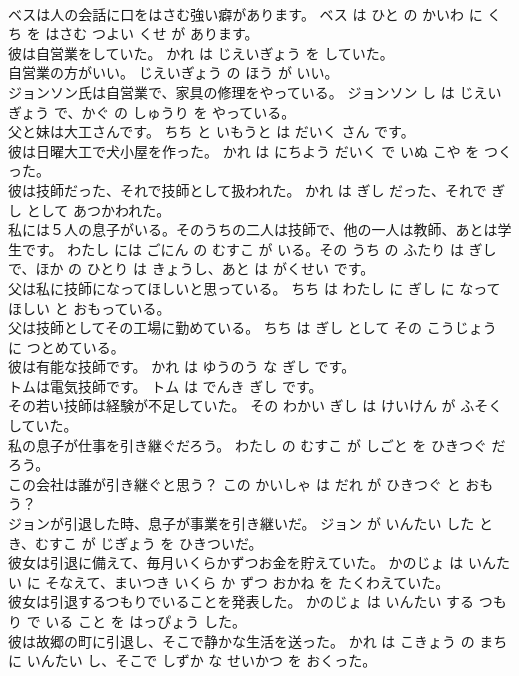 \documentclass[8pt]{extreport}
\begin{document}
\begin{CJK}{UTF8}{min}
\\	ベスは人の会話に口をはさむ強い癖があります。	ベス は ひと の かいわ に くち を はさむ つよい くせ が あります。	
\\	彼は自営業をしていた。	かれ は じえいぎょう を していた。	
\\	自営業の方がいい。	じえいぎょう の ほう が いい。	
\\	ジョンソン氏は自営業で、家具の修理をやっている。	ジョンソン し は じえいぎょう で、かぐ の しゅうり を やっている。	
\\	父と妹は大工さんです。	ちち と いもうと は だいく さん です。	
\\	彼は日曜大工で犬小屋を作った。	かれ は にちよう だいく で いぬ こや を つくった。	
\\	彼は技師だった、それで技師として扱われた。	かれ は ぎし だった、それで ぎし として あつかわれた。	
\\	私には５人の息子がいる。そのうちの二人は技師で、他の一人は教師、あとは学生です。	わたし には ごにん の むすこ が いる。その うち の ふたり は ぎし で、ほか の ひとり は きょうし、あと は がくせい です。	
\\	父は私に技師になってほしいと思っている。	ちち は わたし に ぎし に なって ほしい と おもっている。	
\\	父は技師としてその工場に勤めている。	ちち は ぎし として その こうじょう に つとめている。	
\\	彼は有能な技師です。	かれ は ゆうのう な ぎし です。	
\\	トムは電気技師です。	トム は でんき ぎし です。	
\\	その若い技師は経験が不足していた。	その わかい ぎし は けいけん が ふそく していた。	
\\	私の息子が仕事を引き継ぐだろう。	わたし の むすこ が しごと を ひきつぐ だろう。	
\\	この会社は誰が引き継ぐと思う？	この かいしゃ は だれ が ひきつぐ と おもう？	
\\	ジョンが引退した時、息子が事業を引き継いだ。	ジョン が いんたい した とき、むすこ が じぎょう を ひきついだ。	
\\	彼女は引退に備えて、毎月いくらかずつお金を貯えていた。	かのじょ は いんたい に そなえて、まいつき いくら か ずつ おかね を たくわえていた。	
\\	彼女は引退するつもりでいることを発表した。	かのじょ は いんたい する つもり で いる こと を はっぴょう した。	
\\	彼は故郷の町に引退し、そこで静かな生活を送った。	かれ は こきょう の まち に いんたい し、そこで しずか な せいかつ を おくった。	

\end{CJK}
\end{document}
